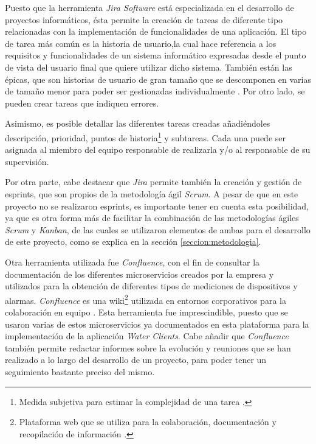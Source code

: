 \documentclass[pdftex,11pt,a4paper]{book}
\begin{document}
Puesto que la herramienta \textit{Jira Software} está especializada en el desarrollo de proyectos informáticos, ésta permite la creación de tareas de diferente tipo relacionadas con la implementación de funcionalidades de una aplicación. El tipo de tarea más común es la historia de usuario,la cual hace referencia a los requisitos y funcionalidades de un sistema informático expresadas desde el punto de vista del usuario final que quiere utilizar dicho sistema. También están las épicas, que son historias de usuario de gran tamaño que se descomponen en varias de tamaño menor para poder ser gestionadas individualmente \cite{bib:epica-HU}. Por otro lado, se pueden crear tareas que indiquen errores.

Asimismo, es posible detallar las diferentes tareas creadas añadiéndoles descripción, prioridad, puntos de historia\footnote{Medida subjetiva para estimar la complejidad de una tarea \cite{bib:puntos-historia}.} y subtareas. Cada una puede ser asignada al miembro del equipo responsable de realizarla y/o al responsable de su supervisión.


Por otra parte, cabe destacar que \textit{Jira} permite también la creación y gestión de esprints, que son propios de la metodología ágil \textit{Scrum}. A pesar de que en este proyecto no se realizaron esprints, es importante tener en cuenta esta posibilidad, ya que es otra forma más de facilitar la combinación de las metodologías ágiles \textit{Scrum} y \textit{Kanban}, de las cuales se utilizaron elementos de ambas para el desarrollo de este proyecto, como se explica en la sección \ref{seccion:metodologia}.

Otra herramienta utilizada fue \textit{Confluence}, con el fin de consultar la documentación de los diferentes microservicios creados por la empresa y utilizados para la obtención de diferentes tipos de mediciones de dispositivos y alarmas. \textit{Confluence} es una wiki\footnote{Plataforma web que se utiliza para la colaboración, documentación y recopilación de información \cite{bib:wiki}.} utilizada en entornos corporativos para la colaboración en equipo \cite{bib:wiki}. Esta herramienta fue imprescindible, puesto que se usaron varias de estos microservicios ya documentados en esta plataforma para la implementación de la aplicación \textit{Water Clients}. Cabe añadir que \textit{Confluence} también permite redactar informes sobre la evolución y reuniones que se han realizado a lo largo del desarrollo de un proyecto, para poder tener un seguimiento bastante preciso del mismo.
\end{document}
